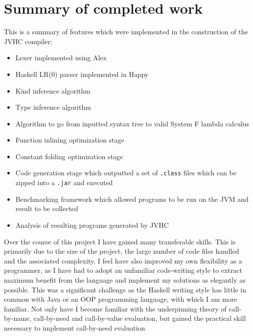 \documentclass[float=false, crop=false]{standalone}
\begin{document}
\section{Summary of completed work}

This is a summary of features which were implemented in the construction
of the JVHC compiler:

\begin{itemize}

  \item Lexer implemented using Alex

  \item Haskell LR(0) parser implemented in Happy

  \item Kind inference algorithm

  \item Type inference algorithm

  \item Algorithm to go from inputted syntax tree to valid
    System F lambda calculus

  \item Function inlining optimization stage

  \item Constant folding optimization stage

  \item Code generation stage which outputted a set of \verb|.class|
    files which can be zipped into a \verb|.jar| and executed

  \item Benchmarking framework which allowed programs to be run on the JVM and 
    result to be collected

  \item Analysis of resulting programs generated by JVHC
\end{itemize}
Over the course of this project I have gained many transferable
skills. This is primarily due to the size of the project, the large number of code files handled and the associated complexity. I feel have also improved my own flexibility as a programmer, as I have had to adopt an unfamiliar code-writing style to extract maximum benefit from the language and implement my solutions as elegantly as possible.
This was a significant challenge as the Haskell writing style has little in common with Java or an OOP
programming language, with which I am more familiar. Not only have I become familiar with the underpinning theory of call-by-name, call-by-need and 
call-by-value evaluation, but gained the practical skill necessary to implement call-by-need evaluation
\end{document}
